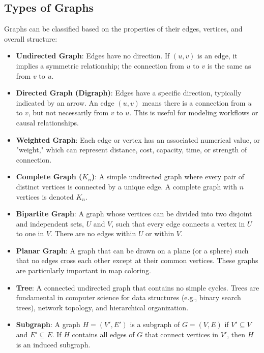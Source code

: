 \documentclass[11pt, a4paper]{article}
\begin{document}
\subsection{Types of Graphs}
Graphs can be classified based on the properties of their edges, vertices, and overall structure:
\begin{itemize}[noitemsep,topsep=3pt,parsep=3pt,partopsep=0pt]
    \item \textbf{Undirected Graph}: Edges have no direction. If $(u,v)$ is an edge, it implies a symmetric relationship; the connection from $u$ to $v$ is the same as from $v$ to $u$.
    \item \textbf{Directed Graph (Digraph)}: Edges have a specific direction, typically indicated by an arrow. An edge $(u,v)$ means there is a connection from $u$ to $v$, but not necessarily from $v$ to $u$. This is useful for modeling workflows or causal relationships.
    \item \textbf{Weighted Graph}: Each edge or vertex has an associated numerical value, or "weight," which can represent distance, cost, capacity, time, or strength of connection.
    \item \textbf{Complete Graph ($K_n$)}: A simple undirected graph where every pair of distinct vertices is connected by a unique edge. A complete graph with $n$ vertices is denoted $K_n$.
    \item \textbf{Bipartite Graph}: A graph whose vertices can be divided into two disjoint and independent sets, $U$ and $V$, such that every edge connects a vertex in $U$ to one in $V$. There are no edges within $U$ or within $V$.
    \item \textbf{Planar Graph}: A graph that can be drawn on a plane (or a sphere) such that no edges cross each other except at their common vertices. These graphs are particularly important in map coloring.
    \item \textbf{Tree}: A connected undirected graph that contains no simple cycles. Trees are fundamental in computer science for data structures (e.g., binary search trees), network topology, and hierarchical organization.
    \item \textbf{Subgraph}: A graph $H=(V', E')$ is a subgraph of $G=(V, E)$ if $V' \subseteq V$ and $E' \subseteq E$. If $H$ contains all edges of $G$ that connect vertices in $V'$, then $H$ is an induced subgraph.
\end{itemize}
\end{document}

